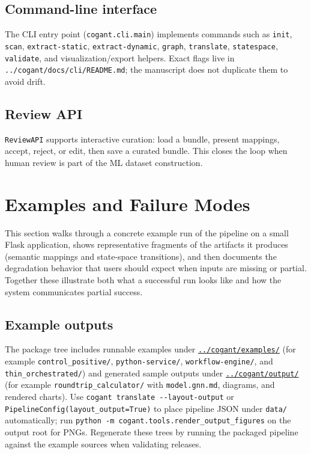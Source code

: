 \documentclass[
]{article}
\begin{document}
\subsection{Command-line interface}\label{command-line-interface}

The CLI entry point (\texttt{cogant.cli.main}) implements commands such
as \texttt{init}, \texttt{scan}, \texttt{extract-static},
\texttt{extract-dynamic}, \texttt{graph}, \texttt{translate},
\texttt{statespace}, \texttt{validate}, and visualization/export
helpers. Exact flags live in \texttt{../cogant/docs/cli/README.md}; the
manuscript does not duplicate them to avoid drift.

\subsection{Review API}\label{review-api}

\texttt{ReviewAPI} supports interactive curation: load a bundle, present
mappings, accept, reject, or edit, then save a curated bundle. This
closes the loop when human review is part of the ML dataset
construction.

\newpage

\section{Examples and Failure Modes}\label{examples-and-failure-modes}

This section walks through a concrete example run of the pipeline on a
small Flask application, shows representative fragments of the artifacts
it produces (semantic mappings and state-space transitions), and then
documents the degradation behavior that users should expect when inputs
are missing or partial. Together these illustrate both what a successful
run looks like and how the system communicates partial success.

\subsection{Example outputs}\label{example-outputs}

The package tree includes runnable examples under
\href{../cogant/examples/}{\texttt{../cogant/examples/}} (for example
\texttt{control\_positive/}, \texttt{python-service/},
\texttt{workflow-engine/}, and \texttt{thin\_orchestrated/}) and
generated sample outputs under
\href{../cogant/output/}{\texttt{../cogant/output/}} (for example
\texttt{roundtrip\_calculator/} with \texttt{model.gnn.md}, diagrams,
and rendered charts). Use \texttt{cogant\ translate\ -\/-layout-output}
or \texttt{PipelineConfig(layout\_output=True)} to place pipeline JSON
under \texttt{data/} automatically; run
\texttt{python\ -m\ cogant.tools.render\_output\_figures} on the output
root for PNGs. Regenerate these trees by running the packaged pipeline
against the example sources when validating releases.
\end{document}
